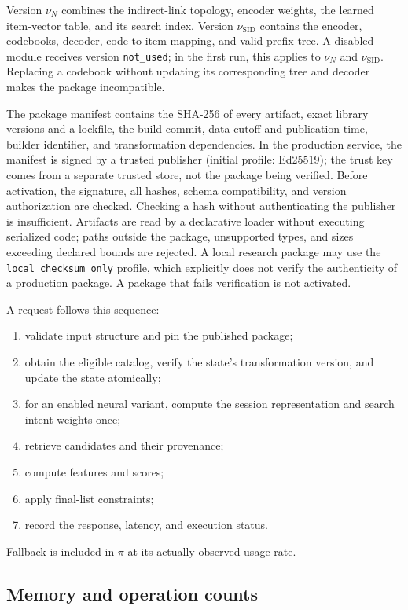 \documentclass[12pt,a4paper]{article}
\newcommand{\code}[1]{{\ttfamily\small\nolinkurl{#1}}}
\theoremstyle{plainru}
\begin{document}
Version $\nu_N$ combines the indirect-link topology, encoder weights,
the learned item-vector table, and its search index.
Version $\nu_{\mathrm{SID}}$ contains the encoder, codebooks,
decoder, code-to-item mapping, and valid-prefix tree.
A disabled module receives version \code{not_used};
in the first run, this applies to $\nu_N$ and $\nu_{\mathrm{SID}}$.
Replacing a codebook without updating its corresponding tree
and decoder makes the package incompatible.

The package manifest contains the SHA-256 of every artifact, exact library
versions and a lockfile, the build commit, data cutoff and publication time,
builder identifier, and transformation dependencies. In the production service,
the manifest is signed by a trusted publisher (initial profile:
Ed25519); the trust key comes from a separate trusted store,
not the package being verified. Before activation, the signature,
all hashes, schema compatibility, and version authorization are checked. Checking a
hash without authenticating the publisher is insufficient. Artifacts are read
by a declarative loader without executing serialized code;
paths outside the package, unsupported types, and sizes exceeding declared
bounds are rejected. A local research package may use
the \code{local_checksum_only} profile, which explicitly does not verify
the authenticity of a production package. A package that fails verification is not activated.

A request follows this sequence:
\begin{enumerate}
\item validate input structure and pin the published package;
\item obtain the eligible catalog, verify the state's transformation
version, and update the state atomically;
\item for an enabled neural variant, compute the session
representation and search intent weights once;
\item retrieve candidates and their provenance;
\item compute features and scores;
\item apply final-list constraints;
\item record the response, latency, and execution status.
\end{enumerate}
Fallback is included in \(\pi\) at its actually observed usage rate.

\subsection{Memory and operation counts}
\end{document}
